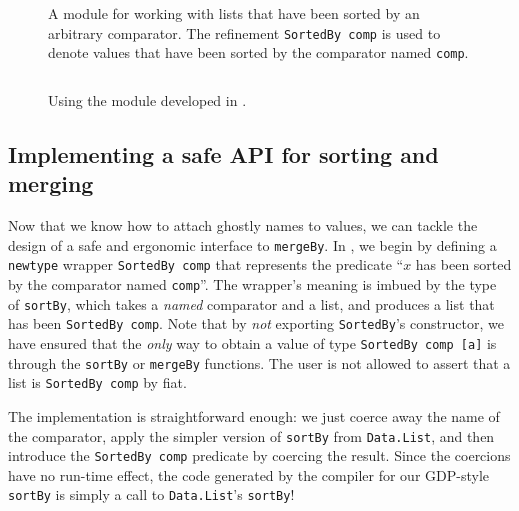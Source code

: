 \documentclass[format=sigplan, review=false, screen=true]{acmart}
\begin{document}

\begin{figure}
  \inputminted{haskell}{ordered.hs}
  \caption{A module for working with lists that have been sorted by an arbitrary
    comparator. The refinement \texttt{SortedBy comp} is used to denote values that
    have been sorted by the comparator named \texttt{comp}.\label{sorted-module}}
\end{figure}


\begin{figure}
  \inputminted{haskell}{usageO.hs}
  \caption{Using the module developed in .\label{sorted-module-demo}}
  \end{figure}

\subsection{Implementing a safe API for sorting and merging}
Now that we know how to attach ghostly names to values, we can tackle the design of a
safe and ergonomic interface to \texttt{mergeBy}. In , we begin by defining
a \texttt{newtype} wrapper \texttt{SortedBy comp} that represents the predicate
``$x$ has been sorted by the comparator named \texttt{comp}''. The
wrapper's meaning is imbued by the type of \texttt{sortBy}, which takes a \emph{named}
comparator and a list, and produces a list that has been \texttt{SortedBy comp}.
Note that by \emph{not} exporting \texttt{SortedBy}'s constructor, we have ensured that
the \emph{only} way to obtain a value of type \texttt{SortedBy comp [a]} is through the
\texttt{sortBy} or \texttt{mergeBy} functions. The user is not allowed to assert that a
list is \texttt{SortedBy comp} by fiat.

The implementation is straightforward enough: we just coerce away the name of the comparator,
apply the simpler version of \texttt{sortBy} from \texttt{Data.List}, and then
introduce the \texttt{SortedBy comp} predicate by coercing the result. Since the coercions have
no run-time effect, the code generated by the compiler for our GDP-style \texttt{sortBy} is
simply a call to \texttt{Data.List}'s \texttt{sortBy}!
\end{document}
